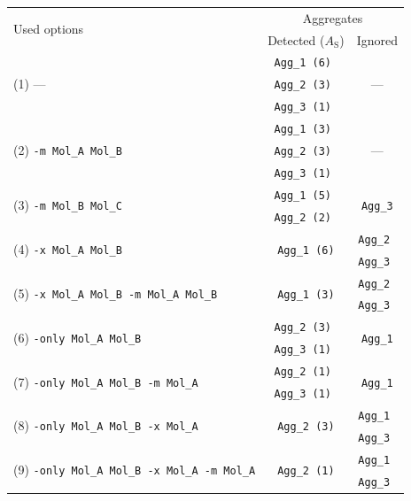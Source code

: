 \begin{longtable}{lcc}
  \toprule
  \multirow{2}{*}{Used options} & \multicolumn{2}{c}{Aggregates} \\
                                & Detected ($A_\text{S}$) & Ignored \\
  \midrule
  \multirow{3}{*}{(1) ---}
               & \tt{Agg_1} (6) & \multirow{3}{*}{---} \\
               & \tt{Agg_2} (3) & \\
               & \tt{Agg_3} (1) & \\
  \midrule
  \multirow{3}{*}{(2) \tt{-m Mol_A Mol_B}}
               & \tt{Agg_1} (3) & \multirow{3}{*}{---} \\
               & \tt{Agg_2} (3) & \\
               & \tt{Agg_3} (1) & \\
  \midrule
  \multirow{2}{*}{(3) \tt{-m Mol_B Mol_C}}
               & \tt{Agg_1} (5) & \multirow{2}{*}{\tt{Agg_3}} \\
               & \tt{Agg_2} (2) & \\
  \midrule
  \multirow{2}{*}{(4) \tt{-x Mol_A Mol_B}} &
  \multirow{2}{*}{\tt{Agg_1} (6)} & \tt{Agg_2} \\
                               &  & \tt{Agg_3} \\
  \midrule
  \multirow{2}{*}{(5) \tt{-x Mol_A Mol_B -m Mol_A Mol_B}} &
  \multirow{2}{*}{\tt{Agg_1} (3)} & \tt{Agg_2} \\
                               &  & \tt{Agg_3} \\
  \midrule
  \multirow{2}{*}{(6) \tt{-only Mol_A Mol_B}}
               & \tt{Agg_2} (3) & \multirow{2}{*}{\tt{Agg_1}} \\
               & \tt{Agg_3} (1) & \\
  \midrule
  \multirow{2}{*}{(7) \tt{-only Mol_A Mol_B -m Mol_A}}
               & \tt{Agg_2} (1) & \multirow{2}{*}{\tt{Agg_1}} \\
               & \tt{Agg_3} (1) & \\
  \midrule
  \multirow{2}{*}{(8) \tt{-only Mol_A Mol_B -x Mol_A}} &
  \multirow{2}{*}{\tt{Agg_2} (3)} & \tt{Agg_1} \\
                               &  & \tt{Agg_3} \\
  \midrule
  \multirow{2}{*}{(9) \tt{-only Mol_A Mol_B -x Mol_A -m Mol_A}} &
  \multirow{2}{*}{\tt{Agg_2} (1)} & \tt{Agg_1} \\
                               &  & \tt{Agg_3} \\
  \bottomrule
\end{longtable}

